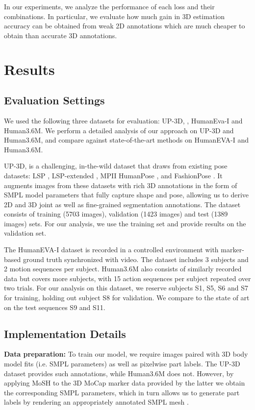 \documentclass[10pt,twocolumn,letterpaper]{article}
\begin{document}
 In our experiments, we analyze the performance of each loss and their combinations. In particular, we evaluate how much gain in 3D estimation accuracy can be obtained from weak 2D annotations which are much cheaper to obtain than accurate 3D annotations. 

 \section{Results}
\subsection{Evaluation Settings}

We used the following three datasets for evaluation: UP-3D,
\cite{Lassner:UP:2017},  HumanEva-I \cite{sigal_humaneva_ijcv10} 
and Human3.6M\cite{ionescu_human36_pami14}.
We perform a detailed analysis of our approach on UP-3D and Human3.6M, 
and compare against state-of-the-art methods on HumanEVA-I and Human3.6M.

UP-3D, is a challenging, in-the-wild dataset that draws from existing pose
datasets: LSP \cite{johnson_lsp_bmvc10}, LSP-extended \cite{johnson_lsp_bmvc10},
MPII HumanPose \cite{andriluka_mpii2d_cvpr14}, and FashionPose \cite{dantone14fashionpose}. It
augments images from these datasets with rich 3D annotations in the form of SMPL
model parameters that fully capture shape and pose, allowing us to derive 2D
and 3D joint as well as fine-grained segmentation annotations. The dataset consists of training 
(5703 images), validation (1423 images) and test (1389 images) sets. 
For our analysis, we use the training set and provide results on the validation set.

The HumanEVA-I dataset is recorded in a controlled environment with marker-based ground truth synchronized with video.
The dataset includes 3 subjects and 2 motion sequences per subject. Human3.6M also consists of similarly recorded data
but covers more subjects, with 15 action sequences per subject repeated over two trials. For our analysis
on this dataset, we reserve subjects S1, S5, S6 and S7 for training, holding out subject S8 for validation. 
We compare to the state of art on the test sequences S9 and S11.

\subsection{Implementation Details}\label{sec:impl-details}

\textbf{Data preparation:} To train our model, we require images paired with 3D body model fits 
(i.e. SMPL parameters) as well as pixelwise part labels. The UP-3D dataset provides such annotations, 
while Human3.6M does not. However, by applying MoSH \cite{Loper:SIGASIA:2014} 
to the 3D MoCap marker data provided by the latter we obtain the corresponding SMPL parameters,
which in turn allows us to generate part labels by rendering an appropriately annotated SMPL mesh \cite{Lassner:UP:2017}. 
\end{document}
